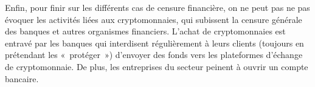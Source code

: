 Enfin, pour finir sur les différents cas de censure financière, on ne peut pas ne pas évoquer les activités liées aux cryptomonnaies, qui subissent la censure générale des banques et autres organismes financiers. L'achat de cryptomonnaies est entravé par les banques qui interdisent régulièrement à leurs clients (toujours en prétendant les «~protéger~») d'envoyer des fonds vers les plateformes d'échange de cryptomonnaie. De plus, les entreprises du secteur peinent à ouvrir un compte bancaire.

